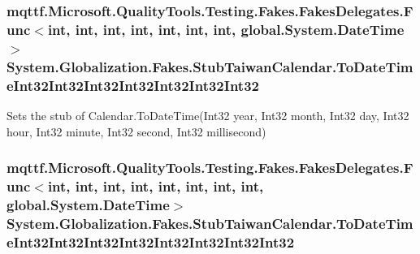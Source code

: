 \hypertarget{class_system_1_1_globalization_1_1_fakes_1_1_stub_taiwan_calendar_aa8648cc6e8a012ea1791e580b9ae24c2}{
\subsubsection[{To\-Date\-Time\-Int32\-Int32\-Int32\-Int32\-Int32\-Int32\-Int32}]{\setlength{\rightskip}{0pt plus 5cm}mqttf.\-Microsoft.\-Quality\-Tools.\-Testing.\-Fakes.\-Fakes\-Delegates.\-Func$<$int, int, int, int, int, int, int, global.\-System.\-Date\-Time$>$ System.\-Globalization.\-Fakes.\-Stub\-Taiwan\-Calendar.\-To\-Date\-Time\-Int32\-Int32\-Int32\-Int32\-Int32\-Int32\-Int32}}\label{class_system_1_1_globalization_1_1_fakes_1_1_stub_taiwan_calendar_aa8648cc6e8a012ea1791e580b9ae24c2}


Sets the stub of Calendar.\-To\-Date\-Time(\-Int32 year, Int32 month, Int32 day, Int32 hour, Int32 minute, Int32 second, Int32 millisecond)

\hypertarget{class_system_1_1_globalization_1_1_fakes_1_1_stub_taiwan_calendar_a80a4b46e70fa36db070f1133afe15156}{
\subsubsection[{To\-Date\-Time\-Int32\-Int32\-Int32\-Int32\-Int32\-Int32\-Int32\-Int32}]{\setlength{\rightskip}{0pt plus 5cm}mqttf.\-Microsoft.\-Quality\-Tools.\-Testing.\-Fakes.\-Fakes\-Delegates.\-Func$<$int, int, int, int, int, int, int, int, global.\-System.\-Date\-Time$>$ System.\-Globalization.\-Fakes.\-Stub\-Taiwan\-Calendar.\-To\-Date\-Time\-Int32\-Int32\-Int32\-Int32\-Int32\-Int32\-Int32\-Int32}}\label{class_system_1_1_globalization_1_1_fakes_1_1_stub_taiwan_calendar_a80a4b46e70fa36db070f1133afe15156}


